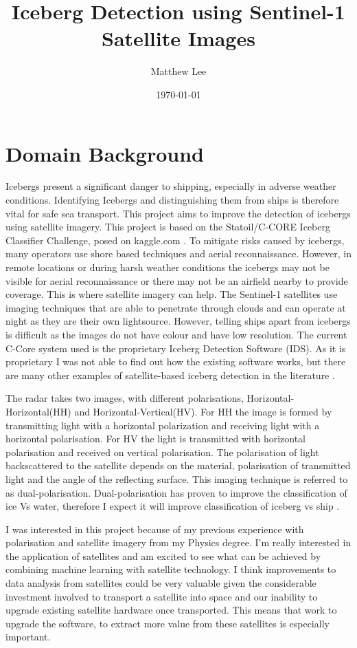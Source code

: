 \documentclass{article}
\begin{document}
\title{Iceberg Detection using Sentinel-1 Satellite Images}
\author{Matthew Lee}
\date{\today}
\maketitle{}
\newpage{}

\section{Domain Background}
Icebergs present a significant danger to shipping, especially in adverse weather conditions. Identifying Icebergs and distinguishing them from ships is therefore vital for safe sea transport. This project aims to improve the detection of icebergs using satellite imagery. This project is based on the Statoil/C-CORE Iceberg Classifier Challenge, posed on kaggle.com \cite{kaggle}. To mitigate risks caused by icebergs, many operators use shore based techniques and aerial reconnaissance. However, in remote locations or during harsh weather conditions the icebergs may not be visible for aerial reconnaissance or there may not be an airfield nearby to provide coverage. This is where satellite imagery can help. The Sentinel-1 satellites use imaging techniques that are able to penetrate through clouds and can operate at night as they are their own lightsource. However, telling ships apart from icebergs is difficult as the images do not have colour and have low resolution. The current C-Core system used is the proprietary Iceberg Detection Software (IDS). As it is proprietary I was not able to find out how the existing software works, but there are many other examples of satellite-based iceberg detection in the literature  \cite{c-core,bentes}. 

The radar takes two images, with different polarisations,  Horizontal-Horizontal(HH) and Horizontal-Vertical(HV). For HH the image is formed by transmitting light with a horizontal polarization and receiving light with a horizontal polarisation. For HV the light is transmitted with horizontal polarisation and received on vertical polarisation. The polarisation of light backscattered to the satellite depends on the material, polarisation of transmitted light and the angle of the reflecting surface. This imaging technique is referred to as dual-polarisation. Dual-polarisation has proven to improve the classification of ice Vs water, therefore I expect it will improve classification of iceberg vs ship \cite{radarsat-mode-selection,yu}. 

I was interested in this project because of my previous experience with polarisation and satellite imagery from my Physics degree. I'm really interested in the application of satellites and am excited to see what can be achieved by combining machine learning with satellite technology. I think improvements to data analysis from satellites could be very valuable given the considerable investment involved to transport a satellite into space and our inability to upgrade existing satellite hardware once transported. This means that work to upgrade the software, to extract more value from these satellites is especially important.  
\end{document}
